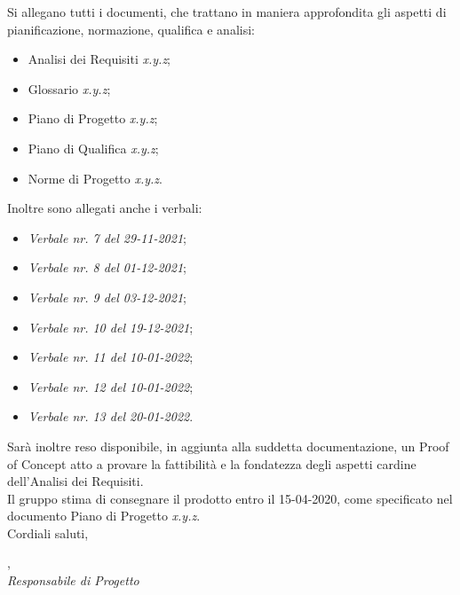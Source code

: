 \documentclass[a4paper, 12pt]{letter}
\begin{document}
\begin{letter}
        Si allegano tutti i documenti, che trattano in maniera approfondita gli aspetti di pianificazione, normazione, qualifica e analisi:
        \begin{itemize}
        	\item Analisi dei Requisiti \textit{x.y.z};
            \item Glossario \textit{x.y.z};
            \item Piano di Progetto \textit{x.y.z};
            \item Piano di Qualifica \textit{x.y.z};
            \item Norme di Progetto \textit{x.y.z}.
        \end{itemize}
        Inoltre sono allegati anche i verbali:
        \begin{itemize}
            \item \textit{Verbale nr. 7 del 29-11-2021};
            \item \textit{Verbale nr. 8 del 01-12-2021};
            \item \textit{Verbale nr. 9 del 03-12-2021};
            \item \textit{Verbale nr. 10 del 19-12-2021};
            \item \textit{Verbale nr. 11 del 10-01-2022};
            \item \textit{Verbale nr. 12 del 10-01-2022};
            \item \textit{Verbale nr. 13 del 20-01-2022}.
        \end{itemize}
        Sarà inoltre reso disponibile, in aggiunta alla suddetta documentazione, un Proof of Concept atto a provare la fattibilità e la fondatezza degli aspetti cardine dell'Analisi dei Requisiti. \\
        Il gruppo stima di consegnare il prodotto entro il 15-04-2020, come specificato nel documento Piano di Progetto \textit{x.y.z}.\\

        Cordiali saluti,
        \begin{flushright}
        	\closing{, \\ \textit{Responsabile di Progetto}} 
        \end{flushright}
    \end{letter}
\end{document}
